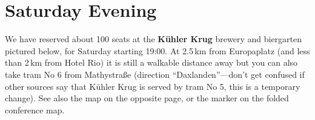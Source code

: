 \newpage\ClearWallPaper

\cropmarkswallpaper

\newpage
{}
\thispagestyle{empty}
\section*{Saturday Evening}

We have reserved about 100 seats at the \textbf{Kühler Krug} brewery
and biergarten pictured below, for Saturday starting 19:00. At
2.5\,km from Europaplatz (and less than 2\,km from Hotel Rio) it is
still a walkable distance away but you can also take tram No 6
from Mathystraße (direction ``Daxlanden''---don't get confused if
other sources say that Kühler Krug is served by tram No 5, this is
a temporary change). See also the map on the opposite page, or
the marker on the folded conference map.
\cropmarkswallpaper
